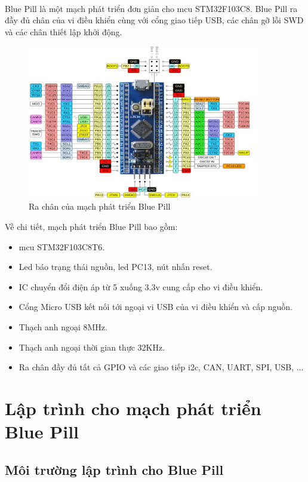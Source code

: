 \paragraph{}
Blue Pill là một mạch phát triển đơn giản cho \acrlong{mcu} STM32F103C8. Blue Pill ra đầy đủ chân của vi điều khiển cùng với cổng giao tiếp USB, các chân gỡ lỗi SWD và các chân thiết lập khởi động. 
\begin{figure}[H]
    \centering
    \includegraphics[width=0.9\textwidth]{images/STM32-Blue-Pill-Development-Board-Pinout.jpg}
    \caption{Ra chân của mạch phát triển Blue Pill}
    \label{fig:bluepill}
\end{figure}
Về chi tiết, mạch phát triển Blue Pill bao gồm:
\begin{itemize}
    \item \acrshort{mcu} STM32F103C8T6.
    \item Led báo trạng thái nguồn, led PC13, nút nhấn reset.
    \item IC chuyển đổi điện áp từ 5 xuống 3.3v cung cấp cho vi điều khiển.
    \item Cổng Micro USB kết nối tới ngoại vi USB của vi điều khiển và cấp nguồn.
    \item Thạch anh ngoại 8MHz.
    \item Thạch anh ngoại thời gian thực 32KHz.
    \item Ra chân đầy đủ tất cả GPIO và các giao tiếp \acrshort{i2c}, CAN, UART, SPI, USB, ...
\end{itemize}
\section{Lập trình cho mạch phát triển Blue Pill}
\subsection{Môi trường lập trình cho Blue Pill}
